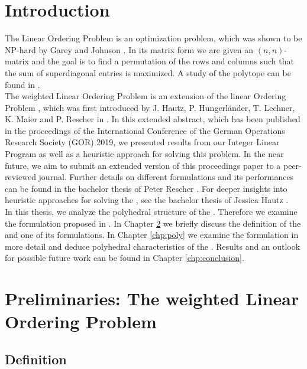 
\chapter{Introduction}\label{chp:introduction}

The Linear Ordering Problem \LOPN is an optimization problem, which was shown to be NP-hard by Garey and Johnson \cite{garey1979computers}. In its matrix form we are given an $(n,n)$-matrix and the goal is to find a permutation of the rows and columns such that the sum of superdiagonal entries is maximized. A study of the \LOPN polytope can be found in \cite{fis92}.\\

The weighted Linear Ordering Problem \wLOPN is an extension of the linear Ordering Problem \LOPN, which was first introduced by J. Hautz, P. Hungerländer, T. Lechner, K. Maier and P. Rescher in \cite{gor19}. In this extended abstract, which has been published in the proceedings of the International Conference of the German Operations Research Society (GOR) 2019, we presented results from our Integer Linear Program \ILPN as well as a heuristic approach for solving this problem. In the near future, we aim to submit an extended version of this proceedings paper to a peer-reviewed journal. Further details on different \ILP formulations and its performances can be found in the bachelor thesis of Peter Rescher \cite{rescher20}. For deeper insights into heuristic approaches for solving the \wLOP , see the bachelor thesis of Jessica Hautz \cite{hautz20}.\\

In this thesis, we analyze the polyhedral structure of the \wLOP. Therefore we examine the \ILP formulation proposed in \cite{gor19}. In Chapter \ref{chp2} we briefly discuss the definition of the \wLOP and one of its \ILP formulations. In Chapter \ref{chp:poly} we examine the \ILP formulation in more detail and deduce polyhedral characteristics of the \wLOP . Results and an outlook for possible future work can be found in Chapter \ref{chp:conclusion}.

\chapter{Preliminaries: The weighted Linear Ordering Problem}\label{chp2}

\section{Definition}

